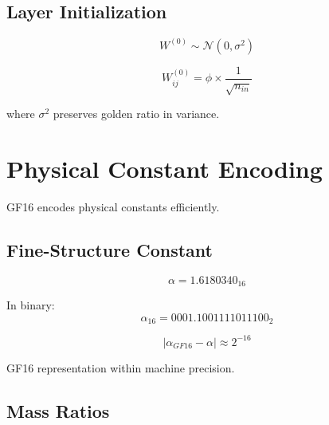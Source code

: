 \subsection{Layer Initialization}

\begin{equation}
W^{(0)} \sim \mathcal{N}(0, \sigma^2)
\end{equation}

\begin{proposition}
\label{prop:golden-init}
\begin{equation}
W_{ij}^{(0)} = \phi \times \frac{1}{\sqrt{n_{in}}}
\end{equation}

where $\sigma^2$ preserves golden ratio in variance.
\end{proposition}

\section{Physical Constant Encoding}

GF16 encodes physical constants efficiently.

\subsection{Fine-Structure Constant}

\begin{definition}[Alpha in GF16]
\label{def:alpha-gf16}
\begin{equation}
\alpha = 1.6180340_16
\end{equation}

In binary:
\begin{equation}
\alpha_{16} = 0001.1001111011100_2
\end{equation}
\end{definition}

\begin{proposition}
\label{prop:alpha-prec}
\begin{equation}
|\alpha_{GF16} - \alpha| \approx 2^{-16}
\end{equation}

GF16 representation within machine precision.
\end{proposition}

\subsection{Mass Ratios}

